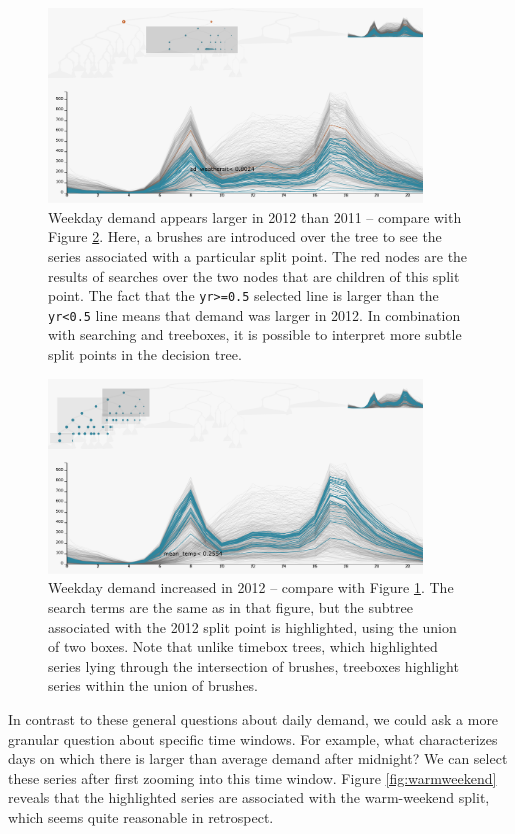 \documentclass[12pt]{article}
\begin{document}
\begin{figure}
  \centering
  \includegraphics[width=375px]{figure/weekday_2011}
    \caption{Weekday demand appears larger in 2012 than 2011 -- compare with Figure 
      \ref{fig:weekday2012}. Here, a brushes are introduced over the tree to see the
      series associated with a particular split point. The red nodes are the results
      of searches over the two nodes that are children of this split point. The fact
      that the \texttt{yr>=0.5} selected line is larger than the \texttt{yr<0.5}
      line means that demand was larger in 2012. In combination with searching and
      treeboxes, it is possible to interpret more subtle split points in the decision
      tree.} \label{fig:weekday2011}
\end{figure}

\begin{figure}
  \centering
  \includegraphics[width=375px]{figure/weekday_2012}
  \caption{Weekday demand increased in 2012 -- compare with 
    Figure \ref{fig:weekday2011}. The search terms are the same as in that figure,
    but the subtree associated with the 2012 split point is highlighted, using the
    union of two boxes. Note that unlike timebox trees, which highlighted series
    lying through the intersection of brushes, treeboxes highlight series within the
    union of brushes.}\label{fig:weekday2012}
\end{figure}

In contrast to these general questions about daily demand, we could ask
a more granular question about specific time windows. For example, what
characterizes days on which there is larger than average demand after
midnight? We can select these series after first zooming into this time window.
Figure \ref{fig:warmweekend} reveals that the highlighted series are associated
with the warm-weekend split, which seems quite reasonable in retrospect.
\end{document}
